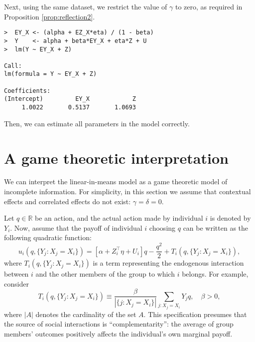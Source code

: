 \documentclass[11pt, A4paper, openany, uplatex]{book}
\begin{document}
Next, using the same dataset, we restrict the value of $\gamma$ to zero, as required in Proposition \ref{prop:reflection2}.
\begin{lstlisting}[basicstyle=\ttfamily\footnotesize, frame=single]
>  EY_X <- (alpha + EZ_X*eta) / (1 - beta)
>  Y    <- alpha + beta*EY_X + eta*Z + U
>  lm(Y ~ EY_X + Z)

Call:
lm(formula = Y ~ EY_X + Z)
	
Coefficients:
(Intercept)         EY_X            Z  
	 1.0022       0.5137       1.0693  
\end{lstlisting}
Then, we can estimate all parameters in the model correctly.

\section{A game theoretic interpretation}

We can interpret the linear-in-means model as a game theoretic model of incomplete information.
For simplicity, in this section we assume that contextual effects and correlated effects do not exist: $\gamma = \delta = 0$.

Let $q\in \mathbb{R}$ be an action, and the actual action made by individual $i$ is denoted by $Y_i$.
Now, assume that the payoff of individual $i$ choosing $q $ can be written as the following quadratic function:
\begin{equation*}
u_i(q, \{Y_j : X_j = X_i \})=\left[ \alpha + Z_i^\top \eta  + U_i \right] q -\frac{q^{2}}{2} + T_i(q, \{Y_j: X_j = X_i \}),
\end{equation*}
where $T_i(q, \{Y_j: X_j = X_i \})$ is a term representing the endogenous interaction between $i$ and the other members of the group to which $i$ belongs.  
For example, consider 
\begin{equation*}
T_i(q, \{Y_j : X_j = X_i \}) \equiv \dfrac{\beta}{|\{j : X_j = X_i \}|}\sum_{j : X_j = X_i}  Y_j q, \quad \beta > 0,
\end{equation*}
where $|A|$ denotes the cardinality of the set $A$.
This specification presumes that the source of social interactions is ``complementarity'': the average of group members' outcomes positively affects the individual's own marginal payoff.
\end{document}
